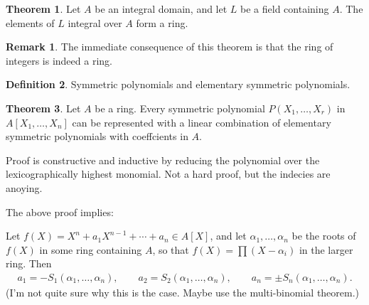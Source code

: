 \documentclass[a4paper]{book}
\theoremstyle{definition}
\newtheorem{definition}{Definition}[]
\newtheorem{theorem}[definition]{Theorem}
\newtheorem*{remark}{Remark}
\begin{document}
\begin{thmbox}
    \begin{theorem}
        Let \(A\) be an integral domain, and let \(L\) be a field containing \(A\). The elements of \(L\) integral over \(A\) form a ring.
    \end{theorem}
\end{thmbox}
\begin{remark}
    The immediate consequence of this theorem is that the ring of integers is indeed a ring.
\end{remark}
\begin{defbox}
    \begin{definition}
        Symmetric polynomials and elementary symmetric polynomials.
    \end{definition}
\end{defbox}
\begin{thmbox}
    \begin{theorem}
        Let \(A\) be a ring. Every symmetric polynomial \(P(X_1, \ldots, X_r)\) in \(A[X_1, \ldots, X_n]\) can be represented with a linear combination of elementary symmetric polynomials with coeffcients in \(A\).
    \end{theorem}
\end{thmbox}
Proof is constructive and inductive by reducing the polynomial over the lexicographically highest monomial. Not a hard proof, but the indecies are anoying.

The above proof implies:

Let \(f(X) = X^n + a_1 X^{n-1} + \cdots + a_n \in A[X]\), and let \(\alpha_1, \ldots, \alpha_n\) be the roots of \(f(X)\) in some ring containing \(A\), so that \(f(X) = \prod (X - \alpha_i)\) in the larger ring. Then
\begin{align*}
    a_1 = -S_1(\alpha_1, \ldots, \alpha_n), \qquad a_2 = S_2(\alpha_1, \ldots, \alpha_n), \qquad a_n = \pm S_n(\alpha_1, \ldots, \alpha_n) \text{.}
\end{align*}
(I'm not quite sure why this is the case. Maybe use the multi-binomial theorem.)
\end{document}
